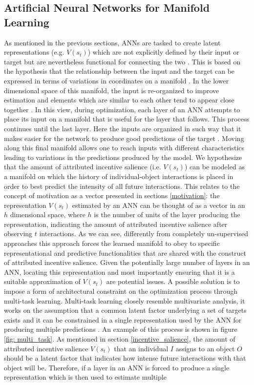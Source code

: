 \subsection{Artificial Neural Networks for Manifold Learning}
\label{manifold_learning}
As mentioned in the previous sections, ANNs are tasked to create latent representations (e.g. $V(s_{t})$) which are not explicitly defined by their input or target but are nevertheless functional for connecting the two \cite{rumelhart1986learning,bengio2017deep,lillicrap2020backpropagation}. This is based on the hypothesis that the relationship between the input and the target can be expressed in terms of variations in coordinates on a manifold \cite{bengio2017deep}. In the lower dimensional space of this manifold, the input is re-organized to improve estimation and elements which are similar to each other tend to appear close together \cite{bengio2017deep}. In this view, during optimization, each layer of an ANN attempts to place its input on a manifold that is useful for the layer that follows. This process continues until the last layer. Here the inputs are organized in such way that it makes easier for the network to produce good predictions of the target \cite{bengio2017deep}. Moving along this final manifold allows one to reach inputs with different characteristics leading to variations in the predictions produced by the model. We hypothesize that the amount of attributed incentive salience (i.e. $V(s_{t})$) can be modeled as a manifold on which the history of individual-object interactions is placed in order to best predict the intensity of all future interactions. This relates to the concept of motivation as a vector presented in sections \ref{motivation}: the representation $V(s_{t})$ estimated by an ANN can be thought of as a vector in an $h$ dimensional space, where $h$ is the number of units of the layer producing the representation, indicating the amount of attributed incentive salience after observing $t$ interactions. As we can see, differently from completely un-supervised approaches this approach forces the learned manifold to obey to specific representational and predictive functionalities that are shared with the construct of attributed incentive salience. Given the potentially large number of layers in an ANN, locating this representation and most importantly ensuring that it is a suitable approximation of $V(s_{t})$ are potential issues. A possible solution is to impose a form of architectural constraint on the optimization process through multi-task learning. Multi-task learning closely resemble multivariate analysis, it  works on the assumption that a common latent factor underlying a set of targets exists and it can be constrained in a single representation used by the ANN for producing multiple predictions \cite{bengio2017deep}. An example of this process is shown in figure \ref{fig: multi_task}. As mentioned in section \ref{incentive_salience}, the amount of attributed incentive salience $V(s_t)$ that an individual $I$ assigns to an object $O$ should be a latent factor that indicates how intense future interactions with that object will be. Therefore, if a layer in an ANN is forced to produce a single representation which is then used to estimate multiple 